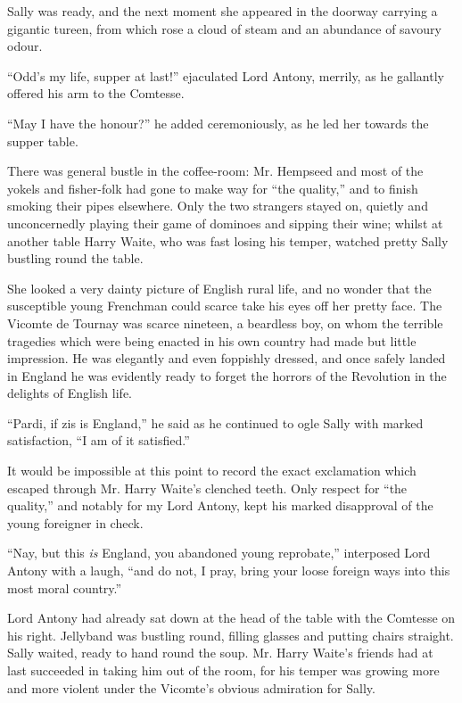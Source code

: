 \documentclass[paper=5.5in:8.5in,BCOR=7mm,twoside,DIV=calc,12pt,usegeometry,chapterprefix,endperiod,headings=big]{scrbook}
\begin{document}
Sally was ready, and the next moment she appeared in the doorway carrying a gigantic tureen, from which rose a cloud of steam and an abundance of savoury odour.

\enquote{Odd's my life, supper at last!} ejaculated Lord Antony, merrily, as he gallantly offered his arm to the Comtesse.

\enquote{May I have the honour?} he added ceremoniously, as he led her towards the supper table.

There was general bustle in the coffee-room: Mr. Hempseed and most of the yokels and fisher-folk had gone to make way for \enquote{the quality,} and to finish smoking their pipes elsewhere. Only the two strangers stayed on, quietly and unconcernedly playing their game of dominoes and sipping their wine; whilst at another table Harry Waite, who was fast losing his temper, watched pretty Sally bustling round the table.

She looked a very dainty picture of English rural life, and no wonder that the susceptible young Frenchman could scarce take his eyes off her pretty face. The Vicomte de Tournay was scarce nineteen, a beardless boy, on whom the terrible tragedies which were being enacted in his own country had made but little impression. He was elegantly and even foppishly dressed, and once safely landed in England he was evidently ready to forget the horrors of the Revolution in the delights of English life.

\enquote{Pardi, if zis is England,} he said as he continued to ogle Sally with marked satisfaction, \enquote{I am of it satisfied.}

It would be impossible at this point to record the exact exclamation which escaped through Mr. Harry Waite's clenched teeth. Only respect for \enquote{the quality,} and notably for my Lord Antony, kept his marked disapproval of the young foreigner in check.

\enquote{Nay, but this \textit{is} England, you abandoned young reprobate,} interposed Lord Antony with a laugh, \enquote{and do not, I pray, bring your loose foreign ways into this most moral country.}

Lord Antony had already sat down at the head of the table with the Comtesse on his right. Jellyband was bustling round, filling glasses and putting chairs straight. Sally waited, ready to hand round the soup. Mr. Harry Waite's friends had at last succeeded in taking him out of the room, for his temper was growing more and more violent under the Vicomte's obvious admiration for Sally.
\end{document}
